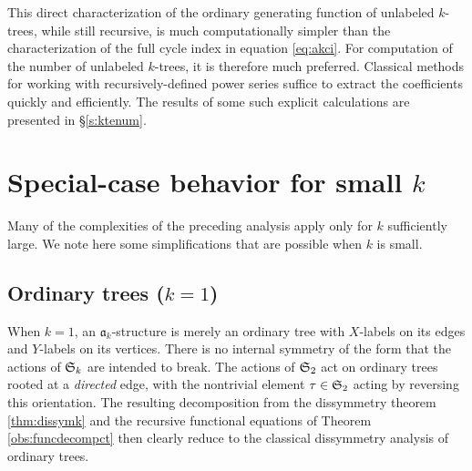\documentclass[sectionflow,singlespace,twoside,boldmathhdr,draft]{brandiss} %
\numberwithin{section}{chapter}
\numberwithin{figure}{chapter}
\begin{document}
This direct characterization of the ordinary generating function of unlabeled $k$-trees, while still recursive, is much computationally simpler than the characterization of the full cycle index in equation \eqref{eq:akci}.
For computation of the number of unlabeled $k$-trees, it is therefore much preferred.
Classical methods for working with recursively-defined power series suffice to extract the coefficients quickly and efficiently.
The results of some such explicit calculations are presented in \S \ref{s:ktenum}.

\section{Special-case behavior for small $k$}
Many of the complexities of the preceding analysis apply only for $k$ sufficiently large.
We note here some simplifications that are possible when $k$ is small.

\subsection{Ordinary trees ($k = 1$)}
When $k = 1$, an $\mathfrak{a}_{k}$-structure is merely an ordinary tree with $X$-labels on its edges and $Y$-labels on its vertices.
There is no internal symmetry of the form that the actions of $ \mathfrak{S}_{k} $ are intended to break.
The actions of $ \mathfrak{S}_{2} $ act on ordinary trees rooted at a \emph{directed} edge, with the nontrivial element $\tau \in  \mathfrak{S}_{2} $ acting by reversing this orientation.
The resulting decomposition from the dissymmetry theorem \ref{thm:dissymk} and the recursive functional equations of Theorem \ref{obs:funcdecompct} then clearly reduce to the classical dissymmetry analysis of ordinary trees.
\end{document}
